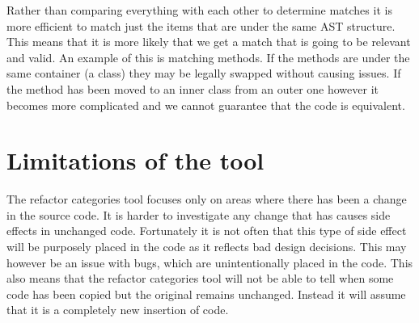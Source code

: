 Rather than comparing everything with each other to determine matches it is more efficient to match just the items that are under the same AST structure.  This means that it is more likely that we get a match that is going to be relevant and valid.  An example of this is matching methods. If the methods are under the same container (a class) they may be legally swapped without causing issues.  If the method has been moved to an inner class from an outer one however it becomes more complicated and we cannot guarantee that the code is equivalent.  


% 

\section{Limitations of the tool}
The refactor categories tool focuses only on areas where there has been a change in the source code. 
It is harder to investigate any change that has causes side effects in unchanged code.  Fortunately it is not often that this type of side effect will be purposely placed in the code as it reflects bad design decisions.  This may however be an issue with bugs, which are unintentionally placed in the code.  
This also means that the refactor categories tool will not be able to tell when some code has been copied but the original remains unchanged. Instead it will assume that it is a completely new insertion of code.
